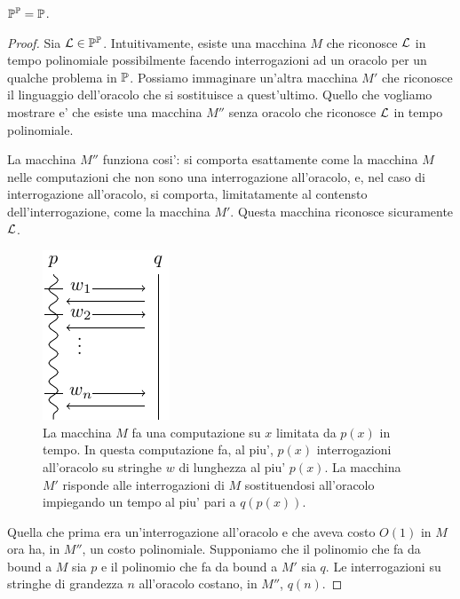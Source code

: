 \begin{thm}\label{thm:PPP}
    $\mathbb{P}^{\mathbb{P}} = \mathbb{P}$.
\end{thm}
\begin{proof}

    Sia $\mathcal{L} \in \mathbb{P}^{\mathbb{P}}$. Intuitivamente, esiste una macchina $M$ che riconosce $\mathcal{L}$
    in tempo polinomiale possibilmente facendo interrogazioni ad un oracolo per un qualche problema
    in $\mathbb{P}$. Possiamo immaginare un'altra macchina $M'$ che riconosce il linguaggio
    dell'oracolo che si sostituisce a quest'ultimo. Quello che vogliamo mostrare e' che esiste una
    macchina $M''$ senza oracolo che riconosce $\mathcal{L}$ in tempo polinomiale.

    La macchina $M''$ funziona cosi': si comporta esattamente come la macchina $M$ nelle
    computazioni che non sono una interrogazione all'oracolo, e, nel caso di interrogazione
    all'oracolo, si comporta, limitatamente al contensto dell'interrogazione, come la macchina $M'$.
    Questa macchina riconosce sicuramente $\mathcal{L}$.

    \begin{figure}[h]
        \begin{center}
            \includegraphics{./img/oracles/PPP.pdf}
            \caption{La macchina $M$ fa una computazione su $x$ limitata da $p(x)$ in tempo. In questa
            computazione fa, al piu', $p(x)$ interrogazioni all'oracolo su stringhe $w$ di lunghezza
        al piu' $p(x)$. La macchina $M'$ risponde alle interrogazioni di $M$ sostituendosi
    all'oracolo impiegando un tempo al piu' pari a $q(p(x))$.}
        \end{center}
    \end{figure}

    Quella che prima era un'interrogazione all'oracolo e che aveva costo $O(1)$ in $M$ ora ha, in
    $M''$, un costo polinomiale. Supponiamo che il polinomio che fa da bound a $M$ sia $p$ e il
    polinomio che fa da bound a $M'$ sia $q$. Le interrogazioni su stringhe di grandezza $n$
    all'oracolo costano, in $M''$, $q(n)$.
    

\end{proof}
